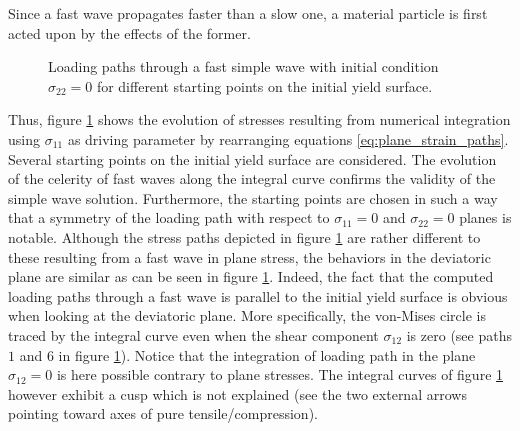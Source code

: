 Since a fast wave propagates faster than a slow one, a material particle is first acted upon by the effects of the former. 
\begin{figure}[h!]
  \centering
  \caption{Loading paths through a fast simple wave with initial condition $\sigma_{22}=0$ for different starting points on the initial yield surface.}
  \label{fig:fast_path_plane_strains}
\end{figure}
Thus, figure \ref{fig:fast_path_plane_strains} shows the evolution of stresses resulting from numerical integration using $\sigma_{11}$ as driving parameter by rearranging equations \eqref{eq:plane_strain_paths}.
Several starting points on the initial yield surface are considered.
The evolution of the celerity of fast waves along the integral curve confirms the validity of the simple wave solution.
Furthermore, the starting points are chosen in such a way that a symmetry of the loading path with respect to $\sigma_{11}=0$ and $\sigma_{22}=0$ planes is notable.
Although the stress paths depicted in figure \ref{fig:fast_path_plane_strains} are rather different to these resulting from a fast wave in plane stress, the behaviors in the deviatoric plane are similar as can be seen in figure \ref{fig:fast_path_plane_strains}. 
Indeed, the fact that the computed loading paths through a fast wave is parallel to the initial yield surface is obvious when looking at the deviatoric plane.
More specifically, the von-Mises circle is traced by the integral curve even when the shear component $\sigma_{12}$ is zero (see paths $1$ and $6$ in figure \ref{fig:fast_path_plane_strains}).
Notice that the integration of loading path in the plane $\sigma_{12}=0$ is here possible contrary to plane stresses.
The integral curves of figure \ref{fig:fast_path_plane_strains} however exhibit a cusp which is not explained (see the two external arrows pointing toward axes of pure tensile/compression).


